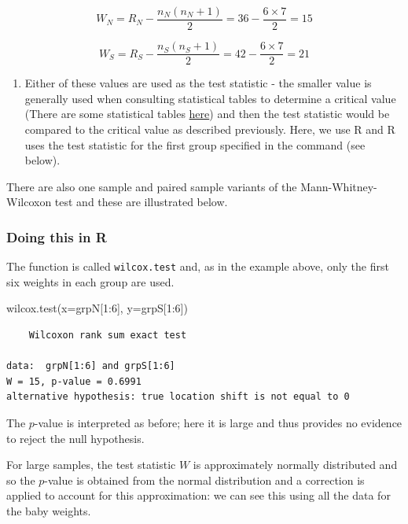 \documentclass[
  oneside]{krantz}
\newenvironment{Shaded}{\begin{snugshade}}{\end{snugshade}}
\newcommand{\AttributeTok}[1]{\textcolor[rgb]{0.77,0.63,0.00}{#1}}
\newcommand{\DecValTok}[1]{\textcolor[rgb]{0.00,0.00,0.81}{#1}}
\newcommand{\FunctionTok}[1]{\textcolor[rgb]{0.00,0.00,0.00}{#1}}
\newcommand{\NormalTok}[1]{#1}
\newcommand{\SpecialCharTok}[1]{\textcolor[rgb]{0.00,0.00,0.00}{#1}}
\providecommand{\tightlist}{%
  \setlength{\itemsep}{0pt}\setlength{\parskip}{0pt}}
\begin{document}
\[W_N = R_N - \frac{n_N(n_N + 1)}{2} = 36 - \frac{6 \times 7}{2} = 15\]

\[W_S = R_S - \frac{n_S(n_S + 1)}{2} = 42 - \frac{6 \times 7}{2} = 21\]

\begin{enumerate}
\def\labelenumi{\arabic{enumi}.}
\setcounter{enumi}{3}
\tightlist
\item
  Either of these values are used as the test statistic - the smaller value is generally used when consulting statistical tables to determine a critical value (There are some statistical tables \href{https://onlinepubs.trb.org/onlinepubs/nchrp/cd-22/manual/v2appendixc.pdf}{here}) and then the test statistic would be compared to the critical value as described previously. Here, we use R and R uses the test statistic for the first group specified in the command (see below).
\end{enumerate}

There are also one sample and paired sample variants of the Mann-Whitney-Wilcoxon test and these are illustrated below.

\hypertarget{doing-this-in-r-15}{%
\subsubsection{Doing this in R}\label{doing-this-in-r-15}}

The function is called \texttt{wilcox.test} and, as in the example above, only the first six weights in each group are used.

\begin{Shaded}
\begin{Highlighting}[]
\FunctionTok{wilcox.test}\NormalTok{(}\AttributeTok{x=}\NormalTok{grpN[}\DecValTok{1}\SpecialCharTok{:}\DecValTok{6}\NormalTok{], }\AttributeTok{y=}\NormalTok{grpS[}\DecValTok{1}\SpecialCharTok{:}\DecValTok{6}\NormalTok{])}
\end{Highlighting}
\end{Shaded}

\begin{verbatim}
    Wilcoxon rank sum exact test

data:  grpN[1:6] and grpS[1:6]
W = 15, p-value = 0.6991
alternative hypothesis: true location shift is not equal to 0
\end{verbatim}

The \(p\)-value is interpreted as before; here it is large and thus provides no evidence to reject the null hypothesis.

For large samples, the test statistic \(W\) is approximately normally distributed and so the \(p\)-value is obtained from the normal distribution and a correction is applied to account for this approximation: we can see this using all the data for the baby weights.
\end{document}
